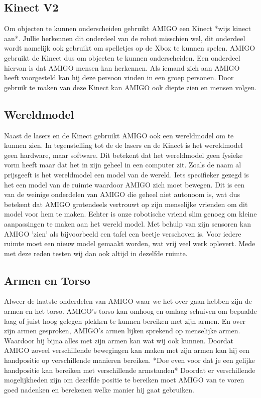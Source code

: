 \documentclass[a4paper,10pt]{article}
\numberwithin{equation}{section}
\numberwithin{figure}{section}
\numberwithin{table}{section}
\begin{document}
\subsection*{Kinect V2}
Om objecten te kunnen onderscheiden gebruikt AMIGO een Kinect *wijs kinect aan*. Jullie herkennen dit onderdeel van de robot misschien wel, dit onderdeel wordt namelijk ook gebruikt om spelletjes op de Xbox te kunnen spelen. AMIGO gebruikt de Kinect dus om objecten te kunnen onderscheiden. Een onderdeel hiervan is dat AMIGO mensen kan herkennen. Als iemand zich aan AMIGO heeft voorgesteld kan hij deze persoon vinden in een groep personen. Door gebruik te maken van deze Kinect kan AMIGO ook diepte zien en mensen volgen.

\subsection*{Wereldmodel}
Naast de lasers en de Kinect gebruikt AMIGO ook een wereldmodel om te kunnen zien. In tegenstelling tot de de lasers en de Kinect is het wereldmodel geen hardware, maar software. Dit betekent dat het wereldmodel geen fysieke vorm heeft maar dat het in zijn geheel in een computer zit. Zoals de naam al prijsgeeft is het wereldmodel een model van de wereld. Iets specifieker gezegd is het een model van de ruimte waardoor AMIGO zich moet bewegen. Dit is een van de weinige onderdelen van AMIGO die geheel niet autonoom is, wat dus betekent dat AMIGO grotendeels vertrouwt op zijn menselijke vrienden om dit model voor hem te maken. Echter is onze robotische vriend slim genoeg om kleine aanpassingen te maken aan het wereld model. Met behulp van zijn sensoren kan AMIGO 'zien' als bijvoorbeeld een tafel een beetje verschoven is. Voor iedere ruimte moet een nieuw model gemaakt worden, wat vrij veel werk oplevert. Mede met deze reden testen wij dan ook altijd in dezelfde ruimte.

\subsection*{Armen en Torso}
Alweer de laatste onderdelen van AMIGO waar we het over gaan hebben zijn de armen en het torso. AMIGO's torso kan omhoog en omlaag schuiven om bepaalde laag of juist hoog gelegen plekken te kunnen bereiken met zijn armen. En over zijn armen gesproken, AMIGO's armen lijken sprekend op menselijke armen. Waardoor hij bijna alles met zijn armen kan wat wij ook kunnen. Doordat AMIGO zoveel verschillende bewegingen kan maken met zijn armen kan hij een handpositie op verschillende manieren bereiken. *Doe even voor dat je een gelijke handpositie kan bereiken met verschillende armstanden* Doordat er verschillende mogelijkheden zijn om dezelfde positie te bereiken moet AMIGO van te voren goed nadenken en berekenen welke manier hij gaat gebruiken.
 
\end{document}
